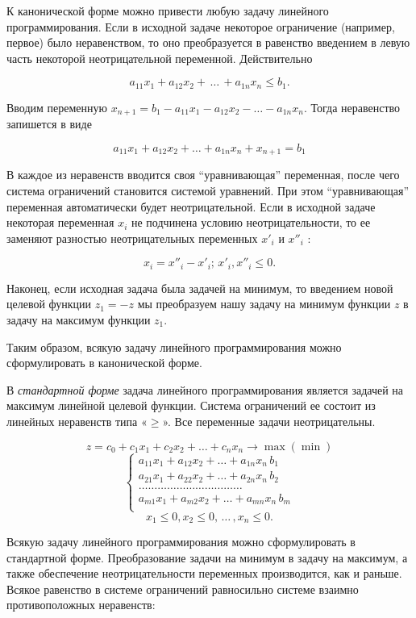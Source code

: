 К канонической форме можно привести любую задачу линейного программирования. Если в исходной задаче некоторое ограничение (например, первое) было неравенством, то оно преобразуется в равенство введением в левую часть некоторой неотрицательной переменной. Действительно

$$
a_{11}x_1+a_{12}x_2+\,\dots\,+a_{1n}x_n\leq b_1.
$$

Вводим переменную  \(x_{n+1}=b_1-a_{11}x_1-a_{12}x_2-\dots-a_{1n}x_n.\) Тогда неравенство запишется в виде

$$
a_{11}x_1+a_{12}x_2+\dots+a_{1n}x_n+x_{n+1}=b_1
$$

В каждое из неравенств вводится своя “уравнивающая” переменная, после чего система ограничений становится системой уравнений. При этом “уравнивающая” переменная автоматически будет неотрицательной. Если в исходной задаче некоторая переменная $x_i$ не подчинена условию неотрицательности, то ее заменяют разностью неотрицательных переменных $x'_i$ и $x''_i$ :

$$
x_i=x''_i-x'_i;\, x'_i, x''_i \leq 0.
$$

Наконец, если исходная задача была задачей на минимум, то введением новой целевой функции $z_1=-z$ мы преобразуем нашу задачу на минимум функции $z$ в задачу на максимум функции $z_1$.

Таким образом, всякую задачу линейного программирования можно сформулировать в канонической форме.

В \textit{стандартной форме} задача линейного программирования является задачей на максимум линейной целевой функции. Система ограничений ее состоит из линейных неравенств типа «$\geq$». Все переменные задачи неотрицательны.

\[z=c_0+c_1x_1+c_2x_2+\dots+c_nx_n \rightarrow \max (\min)\]
$$
\left\{
\begin{array}{ll}
	a_{11}x_1+a_{12}x_2+\dots+a_{1n}x_n \, b_1 \\
	a_{21}x_1+a_{22}x_2+\dots+a_{2n}x_n \, b_2 \\
	\dots\dots\dots\dots\dots\dots\dots\dots\dots\dots\dots\\
	a_{m1}x_1+a_{m2}x_2+\dots+a_{mn}x_n \,  b_m \\
\end{array}
\right.
$$
\[x_1 \leq 0, x_2 \leq 0, \,\dots\, ,x_n \leq 0. \]

Всякую задачу линейного программирования можно сформулировать в стандартной форме. Преобразование задачи на минимум в задачу на максимум, а также обеспечение неотрицательности переменных производится, как и раньше. Всякое равенство в системе ограничений равносильно системе взаимно противоположных неравенств:

